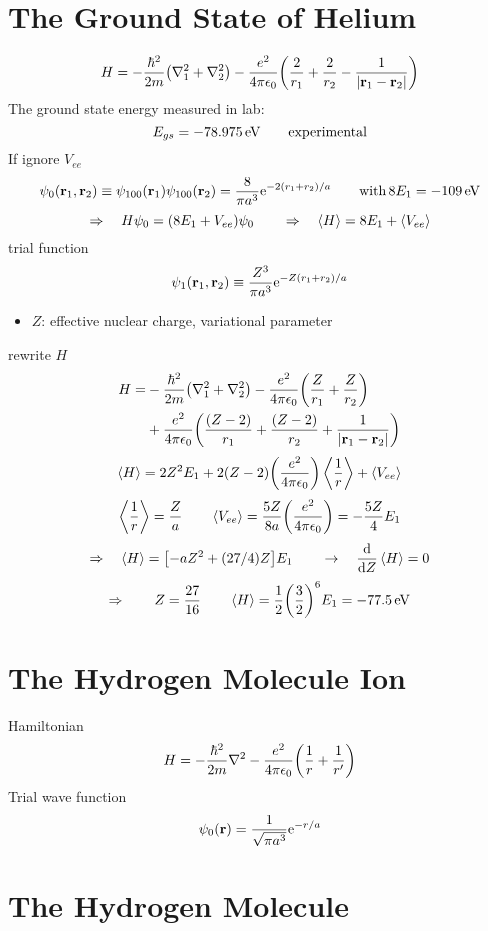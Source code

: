 \section{The Ground State of Helium}
\[H=-\frac{\hbar^2}{2m}\qty(\nabla_1^2 + \nabla_2^2)-\frac{e^2}{4\pi\epsilon_0}\qty(\frac{2}{r_1}+\frac{2}{r_2}-\frac{1}{|\mathbf{r}_1 - \mathbf{r}_2|})\]
The ground state energy measured in  lab:
\[E_{gs} = -78.975 \, {\rm eV}\qquad\text{experimental}\]
If ignore \(V_{ee}\)
\[\psi_0(\mathbf{r}_1,\mathbf{r}_2)\equiv \psi_{100}(\mathbf{r}_1)\psi_{100}(\mathbf{r}_2)=\frac{8}{\pi a^3}{\rm e}^{-2(r_1+r_2)/a} \qquad \text{with} \, 8E_1=-109\,{\rm eV}\]
\[\Rightarrow \quad H\psi_0=(8E_1+V_{ee})\psi_0\qquad\Rightarrow \quad \expval{H}=8E_1+\expval{V_{ee}} \]
trial function 
\[\psi_1(\mathbf{r}_1,\mathbf{r}_2) \equiv \frac{Z^3}{\pi a^3}{\rm e}^{-Z(r_1+r_2)/a}\]
\begin{itemize}
    \item \(Z\): effective nuclear charge, variational parameter
\end{itemize}
rewrite \(H\)
\[\begin{aligned}
    H=&-\frac{\hbar^2}{2m}\qty(\nabla_1^2 + \nabla_2^2)-\frac{e^2}{4\pi\epsilon_0}\qty(\frac{Z}{r_1}+\frac{Z}{r_2}) \\
    &+\frac{e^2}{4\pi\epsilon_0}\qty(\frac{(Z-2)}{r_1}+\frac{(Z-2)}{r_2}+\frac{1}{|\mathbf{r}_1 - \mathbf{r}_2|}) 
\end{aligned}\]
\[\expval{H}=2Z^2E_1+2(Z-2)\qty(\frac{e^2}{4\pi\epsilon_0})\expval{\frac{1}{r}}+\expval{V_{ee}}\]
\[\expval{\frac{1}{r}}=\frac{Z}{a}\qquad\expval{V_{ee}}=\frac{5Z}{8a}\qty(\frac{e^2}{4\pi\epsilon_0})=-\frac{5Z}{4}E_1\]
\[\Rightarrow\quad\expval{H}=\qty[-aZ^2+(27/4)Z]E_1\qquad\rightarrow\quad
  \dv{Z}\expval{H}=0\]
  \[\Rightarrow\qquad Z=\frac{27}{16}\qquad\expval{H}=\frac{1}{2}\qty(\frac{3}{2})^6E_1=-77.5\,{\rm eV}\]
\section{The Hydrogen Molecule Ion}
Hamiltonian \[H=-\frac{\hbar^2}{2m}\nabla^2 - \frac{e^2}{4\pi\epsilon_0}\qty(\frac{1}{r}+\frac{1}{r'})\]
Trial wave function \[\psi_0(\mathbf{r}) = \frac{1}{\sqrt{\pi a^3}}{\rm e}^{-r/a}\]
\section{The Hydrogen Molecule}
